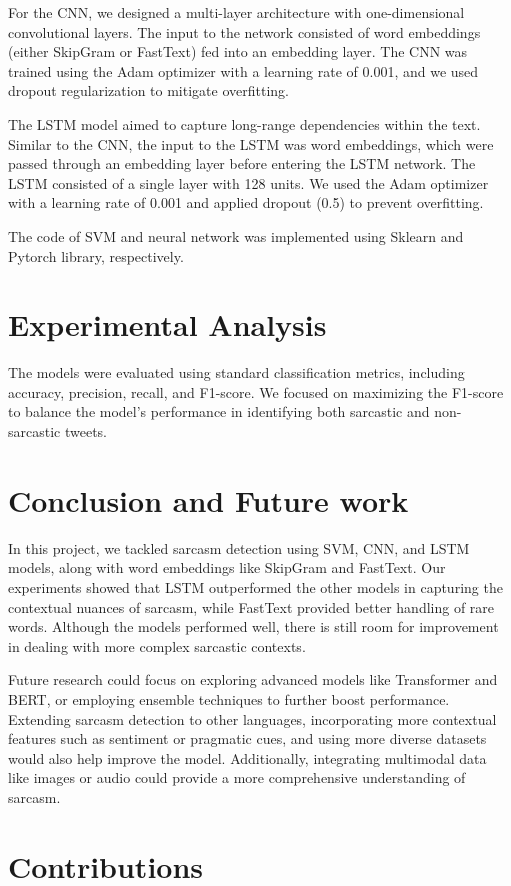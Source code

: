 \documentclass[11pt]{article}
\begin{document}
For the CNN, we designed a multi-layer architecture with one-dimensional convolutional layers. The input to the network consisted of word embeddings (either SkipGram or FastText) fed into an embedding layer. The CNN was trained using the Adam optimizer with a learning rate of 0.001, and we used dropout regularization to mitigate overfitting.

The LSTM model aimed to capture long-range dependencies within the text. Similar to the CNN, the input to the LSTM was word embeddings, which were passed through an embedding layer before entering the LSTM network. The LSTM consisted of a single layer with 128 units. We used the Adam optimizer with a learning rate of 0.001 and applied dropout (0.5) to prevent overfitting.

The code of SVM and neural network was implemented using Sklearn and Pytorch library, respectively.

\section{Experimental Analysis}
The models were evaluated using standard classification metrics, including accuracy, precision, recall, and F1-score. We focused on maximizing the F1-score to balance the model’s performance in identifying both sarcastic and non-sarcastic tweets. 


\section{Conclusion and Future work}
In this project, we tackled sarcasm detection using SVM, CNN, and LSTM models, along with word embeddings like SkipGram and FastText. Our experiments showed that LSTM outperformed the other models in capturing the contextual nuances of sarcasm, while FastText provided better handling of rare words. Although the models performed well, there is still room for improvement in dealing with more complex sarcastic contexts.

Future research could focus on exploring advanced models like Transformer and BERT, or employing ensemble techniques to further boost performance. Extending sarcasm detection to other languages, incorporating more contextual features such as sentiment or pragmatic cues, and using more diverse datasets would also help improve the model. Additionally, integrating multimodal data like images or audio could provide a more comprehensive understanding of sarcasm.

\section{Contributions}
\end{document}
